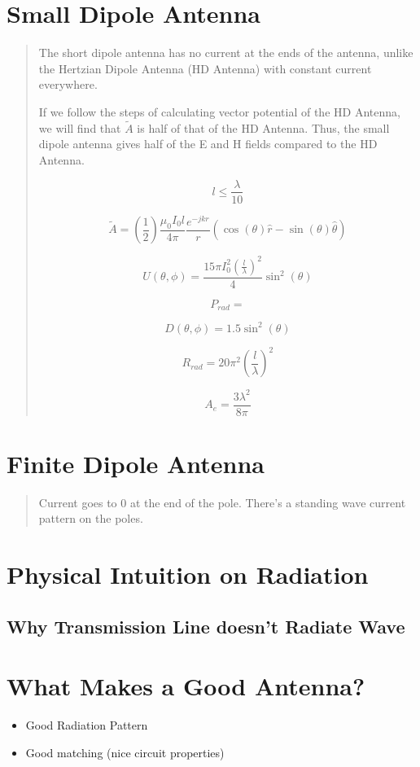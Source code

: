 \documentclass{article} %
\begin{document}
\section{Small Dipole Antenna}

\begin{quote}
    The short dipole antenna has no current at the ends of the antenna, unlike the Hertzian Dipole Antenna (HD Antenna) with constant current everywhere.

    If we follow the steps of calculating vector potential of the HD Antenna, we will find that $\tilde{A}$ is half of that of the HD Antenna. Thus, the small dipole antenna gives half of the E and H fields compared to the HD Antenna.

    \[l \leq \frac{\lambda}{10}\]

    \[\tilde{A} = \left(\frac{1}{2}\right)\frac{\mu_0 I_0 l}{4 \pi}\frac{e^{-jkr}}{r}(\cos(\theta) \hat{r} -\sin(\theta) \hat{\theta})\]

    \[U(\theta, \phi) = \frac{15 \pi I_0 ^2\left(\frac{l}{\lambda}\right)^2}{4} \sin^2(\theta)\]

    \[P_{rad} = \]

    \[D(\theta, \phi) = 1.5 \sin^2(\theta)\]

    \[R_{rad} = 20 \pi^2 \left(\frac{l}{\lambda}\right)^2\]

    \[A_e = \frac{3 \lambda ^2}{8 \pi}\]
\end{quote}

\section{Finite Dipole Antenna}
\begin{quote}
    Current goes to 0 at the end of the pole. There's a standing wave current pattern on the poles.
\end{quote}

\section{Physical Intuition on Radiation}
\subsection{Why Transmission Line doesn't Radiate Wave}

\section{What Makes a Good Antenna?}
\begin{itemize}
    \item Good Radiation Pattern
    \item Good matching (nice circuit properties)
\end{itemize}
\end{document}
